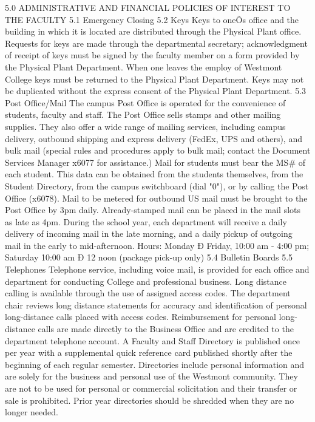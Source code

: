 \documentclass[letterpaper, 11pt]{article}
\begin{document}
5.0 ADMINISTRATIVE AND FINANCIAL POLICIES OF INTEREST TO THE FACULTY
5.1 Emergency Closing
5.2 Keys
   Keys to oneÕs office and the building in which it is located are distributed through the Physical Plant office.  Requests for keys are made through the departmental secretary; acknowledgment of receipt of keys must be signed by the faculty member on a form provided by the Physical Plant Department.  When one leaves the employ of Westmont College keys must be returned to the Physical Plant Department.  Keys may not be duplicated without the express consent of the Physical Plant Department.
5.3 Post Office/Mail
   The campus Post Office is operated for the convenience of students, faculty and staff. The Post Office sells stamps and other mailing supplies. They also offer a wide range of mailing services, including campus delivery, outbound shipping and express delivery (FedEx, UPS and others), and bulk mail (special rules and procedures apply to bulk mail; contact the Document Services Manager x6077 for assistance.)
   Mail for students must bear the MS# of each student. This data can be obtained from the students themselves, from the Student Directory, from the campus switchboard (dial "0"), or by calling the Post Office (x6078).
   Mail to be metered for outbound US mail must be brought to the Post Office by 3pm daily. Already-stamped mail can be placed in the mail slots as late as 4pm. During the school year, each department will receive a daily delivery of incoming mail in the late morning, and a daily pickup of outgoing mail in the early to mid-afternoon.
   Hours:  Monday Ð Friday, 10:00 am - 4:00 pm; Saturday 10:00 am Ð 12 noon (package pick-up only)
5.4 Bulletin Boards
5.5 Telephones
   Telephone service, including voice mail, is provided for each office and department for conducting College and professional business.  Long distance calling is available through the use of assigned access codes.  The department chair reviews long distance statements for accuracy and identification of personal long-distance calls placed with access codes.  Reimbursement for personal long-distance calls are made directly to the Business Office and are credited to the department telephone account.  A Faculty and Staff Directory is published once per year with a supplemental quick reference card published shortly after the beginning of each regular semester.  Directories include personal information and are solely for the business and personal use of the Westmont community.  They are not to be used for personal or commercial solicitation and their transfer or sale is prohibited.  Prior year directories should be shredded when they are no longer needed.
\end{document}
